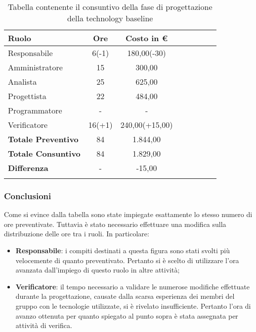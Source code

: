 \begin{longtable}{|l|c|c|c|c|c|c|c|}
	\hline
	\rowcolor{lighter-grayer}
	\textbf{Ruolo}             & \textbf{Ore} & \textbf{Costo in €} \\
	\hline
	\endfirsthead

	\hline
	Responsabile               & 6(-1)           & 180,00(-30)              \\
	\hline
	\hline
	Amministratore             & 15       & 300,00      \\
	\hline
	\hline
	Analista                   & 25       & 625,00   \\
	\hline
	\hline
	Progettista                & 22            & 484,00              \\
	\hline
	\hline
	Programmatore              & -            & -                   \\
	\hline
	\hline
	Verificatore               & 16(+1)       & 240,00(+15,00)    \\
	\hline
	\textbf{Totale Preventivo} & 84          & 1.844,00            \\
	\hline
	\hline
	\textbf{Totale Consuntivo} & 84          & 1.829,00            \\
	\hline
	\hline
	\textbf{Differenza}        & -           & -15,00           \\
	\hline
	\rowcolor{white}
	\caption{Tabella contenente il consuntivo della fase di progettazione della technology baseline}
\end{longtable}
\subsubsection{Conclusioni}
Come si evince dalla tabella sono state impiegate esattamente lo stesso numero di ore preventivate. Tuttavia è stato necessario effettuare una modifica sulla distribuzione delle ore tra i ruoli. In particolare:
\begin{itemize}
	\item \textbf{Responsabile}: i compiti destinati a questa figura  sono stati svolti più velocemente di quanto preventivato. Pertanto si è scelto di utilizzare l'ora avanzata dall'impiego di questo ruolo in altre attività;
	\item  \textbf{Verificatore}: il tempo necessario a validare le numerose modifiche effettuate durante la progettazione, causate dalla scarsa esperienza dei membri del gruppo con le tecnologie utilizzate, si è rivelato insufficiente. Pertanto l'ora di avanzo ottenuta per quanto spiegato al punto sopra è stata assegnata per attività di verifica.
\end{itemize}


